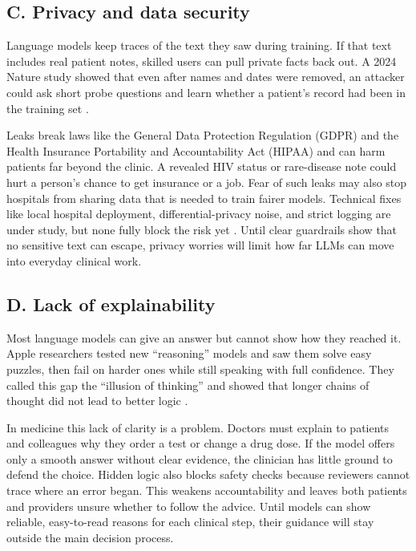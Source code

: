 \documentclass[12pt,a4paper]{scrreprt}
\begin{document}
\subsection*{C. Privacy and data security}
Language models keep traces of the text they saw during training. If that text includes real patient notes, skilled users can pull private facts back out. A 2024 Nature study showed that even after names and dates were removed, an attacker could ask short probe questions and learn whether a patient’s record had been in the training set \autocite{Privacy}.\par
\vspace{\baselineskip}
\noindent
Leaks break laws like the General Data Protection Regulation (GDPR) and the Health Insurance Portability and Accountability Act (HIPAA) and can harm patients far beyond the clinic. A revealed HIV status or rare-disease note could hurt a person’s chance to get insurance or a job. Fear of such leaks may also stop hospitals from sharing data that is needed to train fairer models. Technical fixes like local hospital deployment, differential-privacy noise, and strict logging are under study, but none fully block the risk yet \autocite{Privacy2}. Until clear guardrails show that no sensitive text can escape, privacy worries will limit how far LLMs can move into everyday clinical work.


\subsection*{D. Lack of explainability}
Most language models can give an answer but cannot show how they reached it. Apple researchers tested new “reasoning” models and saw them solve easy puzzles, then fail on harder ones while still speaking with full confidence. They called this gap the “illusion of thinking” and showed that longer chains of thought did not lead to better logic \autocite{Apple}.\par
\vspace{\baselineskip}
\noindent
In medicine this lack of clarity is a problem. Doctors must explain to patients and colleagues why they order a test or change a drug dose. If the model offers only a smooth answer without clear evidence, the clinician has little ground to defend the choice. Hidden logic also blocks safety checks because reviewers cannot trace where an error began. This weakens accountability and leaves both patients and providers unsure whether to follow the advice. Until models can show reliable, easy-to-read reasons for each clinical step, their guidance will stay outside the main decision process.
\end{document}
